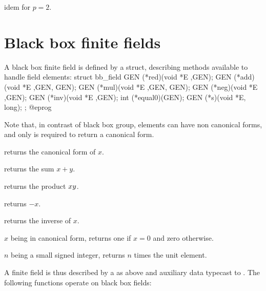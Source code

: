 idem for $p=2$.

\section{Black box finite fields}

A black box finite field is defined by a  struct, describing methods
available to handle field elements:
\bprog
  struct bb_field
  {
    GEN (*red)(void *E ,GEN);
    GEN (*add)(void *E ,GEN, GEN);
    GEN (*mul)(void *E ,GEN, GEN);
    GEN (*neg)(void *E ,GEN);
    GEN (*inv)(void *E ,GEN);
    int (*equal0)(GEN);
    GEN (*s)(void *E, long);
  };
@eprog

Note that, in contrast of black box group, elements can have non canonical forms, and
only  is required to return a canonical form.

 returns the canonical form of $x$.

 returns the sum $x+y$.

 returns the product $x\*y$.

 returns $-x$.

 returns the inverse of $x$.

 $x$ being in canonical form, returns one if $x=0$ and zero otherwise.

 $n$ being a small signed integer, returns $n$ times the unit element.

A finite field is thus described by a  as above and auxiliary
data typecast to . The following functions operate on black box
fields:









